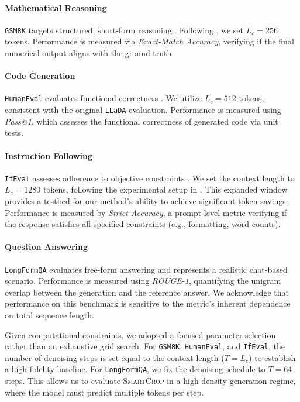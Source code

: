 \documentclass{article}
\theoremstyle{plain}
\theoremstyle{definition}
\theoremstyle{remark}
\begin{document}
\paragraph{Mathematical Reasoning} \texttt{GSM8K} targets structured, short-form reasoning \citep{cobbe2021trainingverifierssolvemath}. Following \citet{nie2025large}, we set $L_c=256$ tokens. Performance is measured via \textit{Exact-Match Accuracy}, verifying if the final numerical output aligns with the ground truth.

\paragraph{Code Generation} \texttt{HumanEval} evaluates functional correctness \citep{chen2021evaluatinglargelanguagemodels}. We utilize $L_c=512$ tokens, consistent with the original \texttt{LLaDA} evaluation. Performance is measured using \textit{Pass@1}, which assesses the functional correctness of generated code via unit tests.

\paragraph{Instruction Following} \texttt{IfEval} assesses adherence to objective constraints \citep{zhou2023instructionfollowingevaluationlargelanguage}. We set the context length to $L_c=1280$ tokens, following the experimental setup in \citet{ye2025dream7bdiffusionlarge}. This expanded window provides a testbed for our method’s ability to achieve significant token savings. Performance is measured by \textit{Strict Accuracy}, a prompt-level metric verifying if the response satisfies all specified constraints (e.g., formatting, word counts).

\paragraph{Question Answering} \texttt{LongFormQA} evaluates free-form answering \citep{koksal2023longform} and represents a realistic chat-based scenario. Performance is measured using \textit{ROUGE-1}, quantifying the unigram overlap between the generation and the reference answer. We acknowledge that performance on this benchmark is sensitive to the metric’s inherent dependence on total sequence length.

Given computational constraints, we adopted a focused parameter selection rather than an exhaustive grid search. For \texttt{GSM8K}, \texttt{HumanEval}, and \texttt{IfEval}, the number of denoising steps is set equal to the context length ($T=L_c$) to establish a high-fidelity baseline. For \texttt{LongFormQA}, we fix the denoising schedule to $T=64$ steps. This allows us to evaluate \textsc{SmartCrop} in a high-density generation regime, where the model must predict multiple tokens per step.
\end{document}

